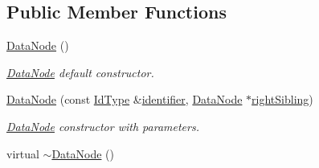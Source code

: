 \subsection*{Public Member Functions}
\begin{DoxyCompactItemize}
\item 
\hyperlink{classDatabase_1_1DataNode_a7999f782bb0465613e703364db8cd22a}{Data\+Node} ()\hypertarget{classDatabase_1_1DataNode_a7999f782bb0465613e703364db8cd22a}{}\label{classDatabase_1_1DataNode_a7999f782bb0465613e703364db8cd22a}

\begin{DoxyCompactList}\small\item\em \hyperlink{classDatabase_1_1DataNode}{Data\+Node} default constructor. \end{DoxyCompactList}\item 
\hyperlink{classDatabase_1_1DataNode_ae5b8832fbaf844bd74739bb7d1ce6737}{Data\+Node} (const \hyperlink{namespaceDatabase_abca840aa37b2fd02e1d82e32a8171437}{Id\+Type} \&\hyperlink{classDatabase_1_1DataNode_a2417b60924a11cf9157b996fbf7b2ca5}{identifier}, \hyperlink{classDatabase_1_1DataNode}{Data\+Node} $\ast$\hyperlink{classDatabase_1_1DataNode_ae335fc33c3813e8a6638d50faef44d5d}{right\+Sibling})
\begin{DoxyCompactList}\small\item\em \hyperlink{classDatabase_1_1DataNode}{Data\+Node} constructor with parameters. \end{DoxyCompactList}\item 
virtual \hyperlink{classDatabase_1_1DataNode_ac58f04cb07497c0b0028398f18f36c4f}{$\sim$\+Data\+Node} ()\hypertarget{classDatabase_1_1DataNode_ac58f04cb07497c0b0028398f18f36c4f}{}\label{classDatabase_1_1DataNode_ac58f04cb07497c0b0028398f18f36c4f}


\end{DoxyCompactItemize}
